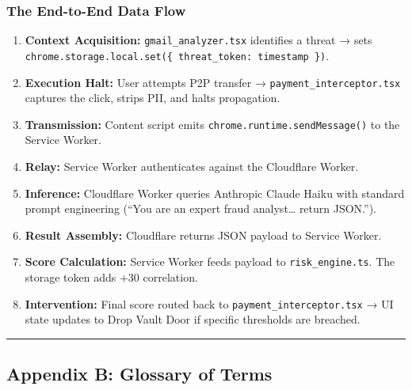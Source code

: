 \documentclass[
]{article}
\providecommand{\tightlist}{%
  \setlength{\itemsep}{0pt}\setlength{\parskip}{0pt}}
\begin{document}
\subsubsection{The End-to-End Data Flow}\label{the-end-to-end-data-flow}

\begin{enumerate}
\def\labelenumi{\arabic{enumi}.}
\tightlist
\item
  \textbf{Context Acquisition:} \texttt{gmail\_analyzer.tsx} identifies
  a threat → sets
  \texttt{chrome.storage.local.set(\{\ threat\_token:\ timestamp\ \})}.
\item
  \textbf{Execution Halt:} User attempts P2P transfer →
  \texttt{payment\_interceptor.tsx} captures the click, strips PII, and
  halts propagation.
\item
  \textbf{Transmission:} Content script emits
  \texttt{chrome.runtime.sendMessage()} to the Service Worker.
\item
  \textbf{Relay:} Service Worker authenticates against the Cloudflare
  Worker.
\item
  \textbf{Inference:} Cloudflare Worker queries Anthropic Claude Haiku
  with standard prompt engineering (``You are an expert fraud
  analyst\ldots{} return JSON.'').
\item
  \textbf{Result Assembly:} Cloudflare returns JSON payload to Service
  Worker.
\item
  \textbf{Score Calculation:} Service Worker feeds payload to
  \texttt{risk\_engine.ts}. The storage token adds +30 correlation.
\item
  \textbf{Intervention:} Final score routed back to
  \texttt{payment\_interceptor.tsx} → UI state updates to Drop Vault
  Door if specific thresholds are breached.
\end{enumerate}

\begin{center}\rule{0.5\linewidth}{0.5pt}\end{center}

\subsection{Appendix B: Glossary of
Terms}\label{appendix-b-glossary-of-terms}
\end{document}
